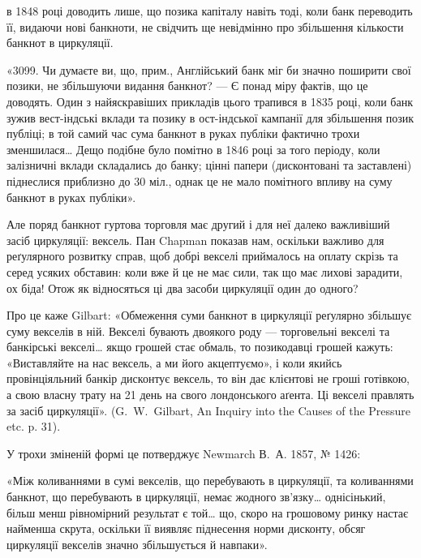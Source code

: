 \parcont{}  %
в 1848 році доводить лише, що позика капіталу навіть тоді, коли банк переводить
її, видаючи нові банкноти, не свідчить ще невідмінно про збільшення
кількости банкнот в циркуляції.

«3099. Чи думаєте ви, що, прим., Англійський банк міг би значно поширити
свої позики, не збільшуючи видання банкнот? — Є понад міру фактів, що
це доводять. Один з найяскравіших прикладів цього трапився в 1835 році, коли
банк зужив вест-індські вклади та позику в ост-індської кампанії для збільшення
позик публіці; в той самий час сума банкнот в руках публіки фактично
трохи зменшилася\dots{} Дещо подібне було помітно в 1846 році за того періоду,
коли залізничні вклади складались до банку; цінні папери (дисконтовані та
заставлені) піднеслися приблизно до 30 міл., однак це не мало помітного
впливу на суму банкнот в руках публіки».

Але поряд банкнот гуртова торговля має другий і для неї далеко важливіший
засіб циркуляції: вексель. Пан Chapman показав нам, оскільки важливо
для реґулярного розвитку справ, щоб добрі векселі приймалось на оплату скрізь
та серед усяких обставин: коли вже й це не має сили, так що має лихові
зарадити, ох біда! Отож як відносяться ці два засоби циркуляції один до одного?

Про це каже Gilbart: «Обмеження суми банкнот в циркуляції реґулярно
збільшує суму векселів в ній. Векселі бувають двоякого роду — торговельні
векселі та банкірські векселі\dots{} якщо грошей стає обмаль, то позикодавці
грошей кажуть: «Виставляйте на нас вексель, а ми його акцептуємо», і коли
якийсь провінціяльний банкір дисконтує вексель, то він дає клієнтові не гроші
готівкою, а свою власну трату на 21 день на свого лондонського аґента. Ці
векселі правлять за засіб циркуляції». (G.~W.~Gilbart, An Inquiry into the Causes
of the Pressure etc. p. 31).

У трохи зміненій формі це потверджує Newmarch В.~А. 1857, № 1426:

«Між коливаннями в сумі векселів, що перебувають в циркуляції, та
коливаннями банкнот, що перебувають в циркуляції, немає жодного зв’язку\dots{}
однісінький, більш менш рівномірний результат є той\dots{} що, скоро на грошовому
ринку настає найменша скрута, оскільки її виявляє піднесення норми дисконту,
обсяг циркуляції векселів значно збільшується й навпаки».

